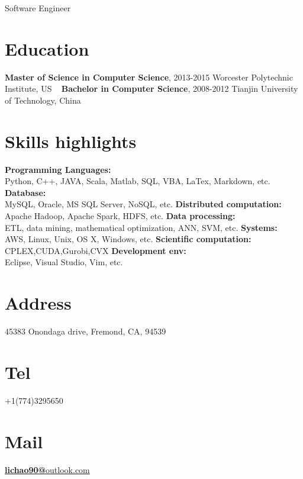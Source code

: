 \documentclass[]{friggeri-cv}
\begin{document}
{Software Engineer}


\begin{aside}
	\section{Education}
	\textbf{Master of Science in 
	Computer Science}, 
	2013-2015
	Worcester Polytechnic 
	Institute, US
	~
	\textbf{Bachelor in 
	Computer Science}, 
	2008-2012
	Tianjin University of 
	Technology, China
	\section{Skills highlights}
	\textbf{Programming Languages:}\\
	Python, C++, JAVA, Scala, Matlab, SQL, VBA, LaTex, Markdown, etc.
	\vspace{3mm}
	\textbf{Database:}\\
	MySQL, Oracle, MS SQL Server, NoSQL, etc.
	\vspace{3mm}
	\textbf{Distributed computation:}\\
	Apache Hadoop, Apache Spark, HDFS, etc.
	\vspace{3mm}
	\textbf{Data processing:}\\
	ETL, data mining, mathematical optimization, ANN, SVM, etc.
	\vspace{3mm}
	\textbf{Systems:}\\
	AWS, Linux, Unix, OS X, Windows, etc.
	\vspace{3mm}
	\textbf{Scientific computation:}\\
	CPLEX,CUDA,Gurobi,CVX
	\vspace{3mm}
	\textbf{Development env:}\\
	Eclipse, Visual Studio, Vim, etc.
	\section{Address}
	45383 Onondaga drive,
	Fremond, CA, 94539
	\section{Tel}
	+1(774)3295650
	\section{Mail}
	\href{mailto:lichao90@outlook.com}{\textbf{lichao90@}outlook.com}

\end{aside}
\end{document}
